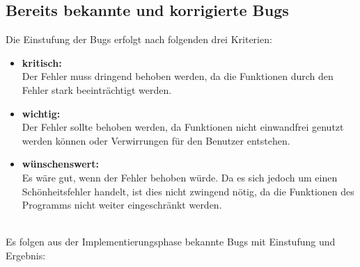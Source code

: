 \documentclass[a4paper]{article}
\begin{document}
\subsection{Bereits bekannte und korrigierte Bugs}
Die Einstufung der Bugs erfolgt nach folgenden drei Kriterien:
\begin{itemize}
\item \textbf{kritisch:} \\
Der Fehler muss dringend behoben werden, da die Funktionen durch den Fehler stark beeinträchtigt werden.
\item \textbf{wichtig:} \\
Der Fehler sollte behoben werden, da Funktionen nicht einwandfrei genutzt werden können oder Verwirrungen für den Benutzer entstehen.
\item \textbf{wünschenswert:} \\
Es wäre gut, wenn der Fehler behoben würde. Da es sich jedoch um einen Schönheitsfehler handelt, ist dies nicht zwingend nötig, da die Funktionen des Programms nicht weiter eingeschränkt werden.
\end{itemize}
\ \\
\noindent
Es folgen aus der Implementierungsphase bekannte Bugs mit Einstufung und Ergebnis:
\end{document}
